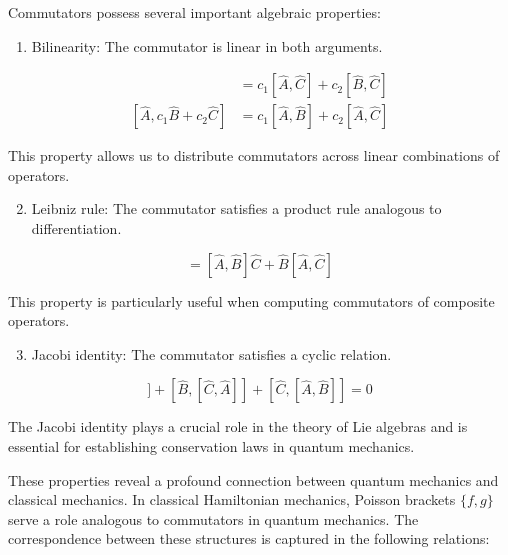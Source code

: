 \documentclass[italian]{HKNdocument}
\begin{document}
Commutators possess several important algebraic properties:

\begin{enumerate}
  \item Bilinearity: The commutator is linear in both arguments.
\end{enumerate}

\begin{align*}
[c_{1}\hat{A} + c_{2}\hat{B}, \hat{C}] &= c_{1}[\hat{A}, \hat{C}] + c_{2}[\hat{B}, \hat{C}] \\
[\hat{A}, c_{1}\hat{B} + c_{2}\hat{C}] &= c_{1}[\hat{A}, \hat{B}] + c_{2}[\hat{A}, \hat{C}] \tag{1.53}
\end{align*}

This property allows us to distribute commutators across linear combinations of operators.

\begin{enumerate}
  \setcounter{enumi}{1}
  \item Leibniz rule: The commutator satisfies a product rule analogous to differentiation.
\end{enumerate}

\begin{equation*}
[\hat{A}, \hat{B}\hat{C}] = [\hat{A}, \hat{B}]\hat{C} + \hat{B}[\hat{A}, \hat{C}] \tag{1.54}
\end{equation*}

This property is particularly useful when computing commutators of composite operators.

\begin{enumerate}
  \setcounter{enumi}{2}
  \item Jacobi identity: The commutator satisfies a cyclic relation.
\end{enumerate}

\begin{equation*}
[\hat{A},[\hat{B}, \hat{C}]] + [\hat{B},[\hat{C}, \hat{A}]] + [\hat{C},[\hat{A}, \hat{B}]] = 0 \tag{1.55}
\end{equation*}

The Jacobi identity plays a crucial role in the theory of Lie algebras and is essential for establishing conservation laws in quantum mechanics.

These properties reveal a profound connection between quantum mechanics and classical mechanics. In classical Hamiltonian mechanics, Poisson brackets $\{f,g\}$ serve a role analogous to commutators in quantum mechanics. The correspondence between these structures is captured in the following relations:
\end{document}
